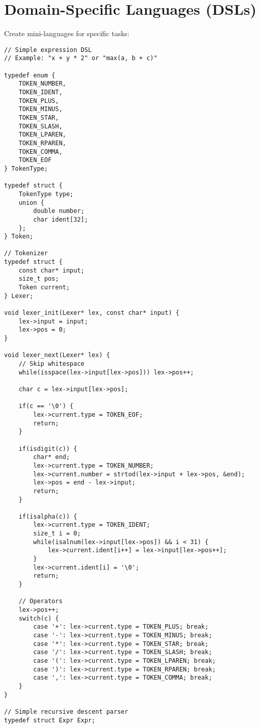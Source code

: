 \section{Domain-Specific Languages (DSLs)}

Create mini-languages for specific tasks:

\begin{lstlisting}
// Simple expression DSL
// Example: "x + y * 2" or "max(a, b + c)"

typedef enum {
    TOKEN_NUMBER,
    TOKEN_IDENT,
    TOKEN_PLUS,
    TOKEN_MINUS,
    TOKEN_STAR,
    TOKEN_SLASH,
    TOKEN_LPAREN,
    TOKEN_RPAREN,
    TOKEN_COMMA,
    TOKEN_EOF
} TokenType;

typedef struct {
    TokenType type;
    union {
        double number;
        char ident[32];
    };
} Token;

// Tokenizer
typedef struct {
    const char* input;
    size_t pos;
    Token current;
} Lexer;

void lexer_init(Lexer* lex, const char* input) {
    lex->input = input;
    lex->pos = 0;
}

void lexer_next(Lexer* lex) {
    // Skip whitespace
    while(isspace(lex->input[lex->pos])) lex->pos++;

    char c = lex->input[lex->pos];

    if(c == '\0') {
        lex->current.type = TOKEN_EOF;
        return;
    }

    if(isdigit(c)) {
        char* end;
        lex->current.type = TOKEN_NUMBER;
        lex->current.number = strtod(lex->input + lex->pos, &end);
        lex->pos = end - lex->input;
        return;
    }

    if(isalpha(c)) {
        lex->current.type = TOKEN_IDENT;
        size_t i = 0;
        while(isalnum(lex->input[lex->pos]) && i < 31) {
            lex->current.ident[i++] = lex->input[lex->pos++];
        }
        lex->current.ident[i] = '\0';
        return;
    }

    // Operators
    lex->pos++;
    switch(c) {
        case '+': lex->current.type = TOKEN_PLUS; break;
        case '-': lex->current.type = TOKEN_MINUS; break;
        case '*': lex->current.type = TOKEN_STAR; break;
        case '/': lex->current.type = TOKEN_SLASH; break;
        case '(': lex->current.type = TOKEN_LPAREN; break;
        case ')': lex->current.type = TOKEN_RPAREN; break;
        case ',': lex->current.type = TOKEN_COMMA; break;
    }
}

// Simple recursive descent parser
typedef struct Expr Expr;


\end{lstlisting}
